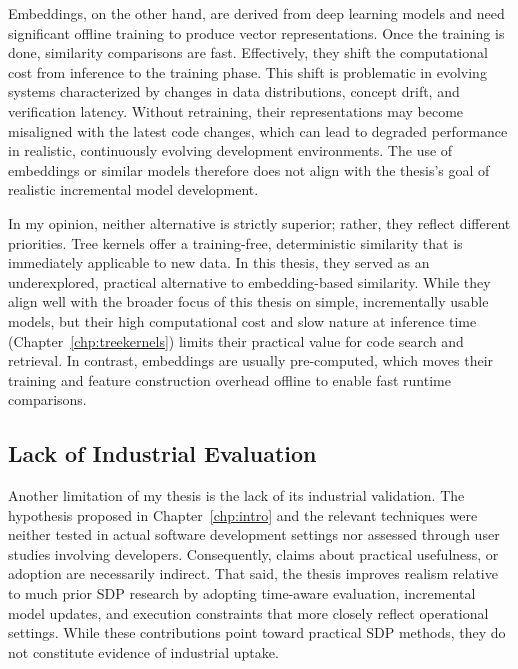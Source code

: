 \documentclass[\main/thesis.tex]{subfiles}
\begin{document}
Embeddings, on the other hand, are derived from deep learning models and need significant offline training to produce vector representations. Once the training is done, similarity comparisons are fast. Effectively, they shift the computational cost from inference to the training phase. This shift is problematic in evolving systems characterized by changes in data distributions, concept drift, and verification latency. Without retraining, their representations may become misaligned with the latest code changes, which can lead to degraded performance in realistic, continuously evolving development environments. The use of embeddings or similar models therefore does not align with the thesis's goal of realistic incremental model development.


In my opinion, neither alternative is strictly superior; rather, they reflect different priorities. Tree kernels offer a training-free, deterministic similarity that is immediately applicable to new data. In this thesis, they served as an underexplored, practical alternative to embedding-based similarity. 
While they align well with the broader focus of this thesis on simple, incrementally usable models, but their high computational cost and slow nature at inference time (Chapter~\ref{chp:treekernels}) limits their practical value for code search and retrieval. In contrast, embeddings are usually pre-computed, which moves their training and feature construction overhead offline to enable fast runtime comparisons. %


\subsection{Lack of Industrial Evaluation }
Another limitation of my thesis is the lack of its industrial validation. The hypothesis proposed in Chapter~\ref{chp:intro} and the relevant techniques were neither tested in actual software development settings nor assessed through user studies involving developers. Consequently, claims about practical usefulness, or adoption are necessarily indirect. 
That said, the thesis improves realism relative to much prior SDP research by adopting time-aware evaluation, incremental model updates, and execution constraints that more closely reflect operational settings. While these contributions point toward practical SDP methods, they do not constitute evidence of industrial uptake.
\end{document}
